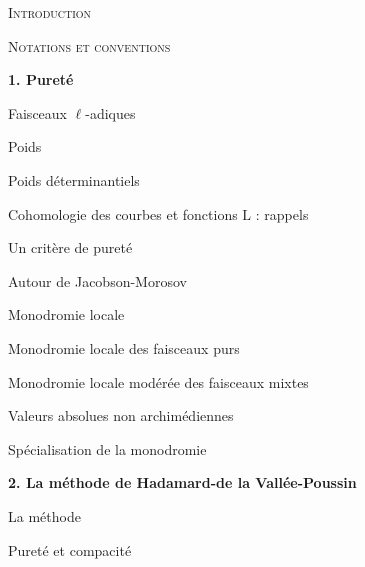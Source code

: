 \documentclass[11pt,leqno]{article}
\begin{document}
\begingroup
\small
\noindent\textsc{Introduction}\dotfill{}\par
\medskip
\noindent\textsc{Notations et conventions}\dotfill{}\par
\medskip
\noindent\textbf{1. Pureté}\dotfill{}\par
\noindent\hspace*{1em}Faisceaux \(\ell\)-adiques\dotfill{}\par
\noindent\hspace*{1em}Poids\dotfill{}\par
\noindent\hspace*{1em}Poids déterminantiels\dotfill{}\par
\noindent\hspace*{1em}Cohomologie des courbes et fonctions \(\mathrm{L}\) : rappels\dotfill{}\par
\noindent\hspace*{1em}Un critère de pureté\dotfill{}\par
\noindent\hspace*{1em}Autour de Jacobson-Morosov\dotfill{}\par
\noindent\hspace*{1em}Monodromie locale\dotfill{}\par
\noindent\hspace*{1em}Monodromie locale des faisceaux purs\dotfill{}\par
\noindent\hspace*{1em}Monodromie locale modérée des faisceaux mixtes\dotfill{}\par
\noindent\hspace*{1em}Valeurs absolues non archimédiennes\dotfill{}\par
\noindent\hspace*{1em}Spécialisation de la monodromie\dotfill{}\par
\medskip
\noindent\textbf{2. La méthode de Hadamard-de la Vallée-Poussin}\dotfill{}\par
\noindent\hspace*{1em}La méthode\dotfill{}\par
\noindent\hspace*{1em}Pureté et compacité\dotfill{}\par
\end{document}
